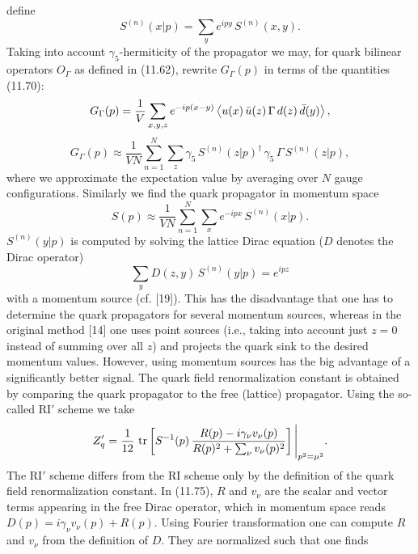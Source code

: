 define
\begin{equation}
S^{(n)}(x|p) = \sum_y e^{ipy}\, S^{(n)}(x, y) .
\end{equation}
Taking into account $\gamma_5$-hermiticity of the propagator we may, for quark bilinear operators $O_\Gamma$ as defined in (11.62), rewrite $G_\Gamma(p)$ in terms of the quantities
(11.70):
\begin{equation}
G_\Gamma(p) =
\frac{1}{V}\sum_{x,y,z} e^{-ip(x-y)}
\left\langle u(x)\,\bar{u}(z)\,\Gamma\, d(z)\,\bar{d}(y) \right\rangle ,
\end{equation}
\begin{equation}
G_\Gamma(p) \approx \frac{1}{VN}\sum_{n=1}^{N}\sum_z
\gamma_5\, S^{(n)}(z|p)^\dagger\, \gamma_5\, \Gamma\, S^{(n)}(z|p) ,
\end{equation}
where we approximate the expectation value by averaging over $N$ gauge configurations. Similarly we find the quark propagator in momentum space
\begin{equation}
S(p) \approx \frac{1}{VN}\sum_{n=1}^{N}\sum_x e^{-ipx}\, S^{(n)}(x|p) .
\end{equation}
$S^{(n)}(y|p)$ is computed by solving the lattice Dirac equation ($D$ denotes the
Dirac operator)
\begin{equation}
\sum_y D(z, y)\, S^{(n)}(y|p) = e^{ipz}
\end{equation}
with a momentum source (cf. [19]). This has the disadvantage that one has to
determine the quark propagators for several momentum sources, whereas in
the original method [14] one uses point sources (i.e., taking into account just
$z = 0$ instead of summing over all $z$) and projects the quark sink to the desired
momentum values. However, using momentum sources has the big advantage
of a significantly better signal.
The quark field renormalization constant is obtained by comparing the
quark propagator to the free (lattice) propagator. Using the so-called RI$'$
scheme we take
\begin{equation}
Z_q' =
\frac{1}{12}\,
\operatorname{tr}\left[S^{-1}(p)\,
\frac{R(p) - i\gamma_\nu v_\nu(p)}
{R(p)^2 + \sum_\nu v_\nu(p)^2}\right]
\Bigg|_{p^2 = \mu^2} .
\end{equation}
The RI$'$ scheme differs from the RI scheme only by the definition of the quark
field renormalization constant. In (11.75), $R$ and $v_\nu$ are the scalar and vector
terms appearing in the free Dirac operator, which in momentum space reads
$D(p) = i\gamma_\nu v_\nu(p) + R(p)$. Using Fourier transformation one can compute $R$
and $v_\nu$ from the definition of $D$. They are normalized such that one finds
